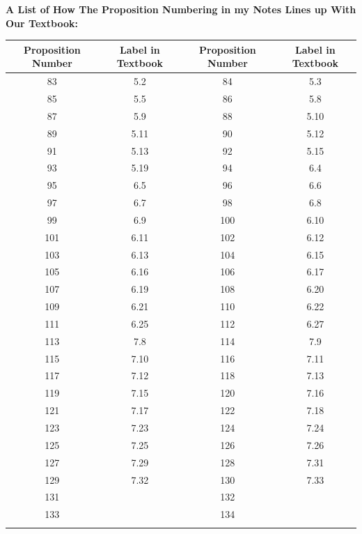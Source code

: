 \documentclass{book}
\newenvironment{allowTableDashes}{\ADLactivate}{\ADLinactivate}
\newcommand{\exOne}{%
   \color{Purple}%
   \fontsize{14}{16}\selectfont%
}
\newcommand{\retTwo}{\hfill\bigbreak}
\newcommand{\myVS}{\vphantom{$\int_a^b$}}
\begin{document}
\newpage
{\huge \color{Black} \textbf{A List of How The Proposition Numbering in my Notes Lines up With Our Textbook:} \retTwo}
\exOne

\begin{allowTableDashes}
   \begin{tabular}{ c|c||c|c }
      Proposition Number & Label in Textbook & Proposition Number & Label in Textbook \\ \hline
      
      \myVS 83 & 5.2 & 84 & 5.3 \\ \hdashline[10pt/3pt]
      \myVS 85 & 5.5 & 86 & 5.8 \\ \hdashline[10pt/3pt]
      \myVS 87 & 5.9  & 88 & 5.10 \\ \hdashline[10pt/3pt]
      \myVS 89 & 5.11 & 90 & 5.12 \\ \hdashline[10pt/3pt]
      \myVS 91 & 5.13 & 92 & 5.15 \\ \hdashline[10pt/3pt]
      \myVS 93 & 5.19 & 94 & 6.4  \\ \hdashline[10pt/3pt]
      \myVS 95 & 6.5 & 96 & 6.6 \\ \hdashline[10pt/3pt]
      \myVS 97 & 6.7 & 98 & 6.8 \\ \hdashline[10pt/3pt]
      \myVS 99 & 6.9 & 100 & 6.10 \\ \hdashline[10pt/3pt]
      \myVS 101 & 6.11 & 102 & 6.12 \\ \hdashline[10pt/3pt]
      \myVS 103 & 6.13 & 104 & 6.15 \\ \hdashline[10pt/3pt]
      \myVS 105 & 6.16 & 106 & 6.17 \\ \hdashline[10pt/3pt]
      \myVS 107 & 6.19 & 108 & 6.20 \\ \hdashline[10pt/3pt]
      \myVS 109 & 6.21 & 110 & 6.22 \\ \hdashline[10pt/3pt]
      \myVS 111 & 6.25 & 112 & 6.27 \\ \hdashline[10pt/3pt]
      \myVS 113 & 7.8 & 114 & 7.9 \\ \hdashline[10pt/3pt]
      \myVS 115 & 7.10 & 116 & 7.11 \\ \hdashline[10pt/3pt]
      \myVS 117 & 7.12 & 118 & 7.13 \\ \hdashline[10pt/3pt]
      \myVS 119 & 7.15 & 120 & 7.16 \\ \hdashline[10pt/3pt]
      \myVS 121 & 7.17 & 122 & 7.18 \\ \hdashline[10pt/3pt]
      \myVS 123 & 7.23 & 124 & 7.24 \\ \hdashline[10pt/3pt]
      \myVS 125 & 7.25 & 126 & 7.26 \\ \hdashline[10pt/3pt]
      \myVS 127 & 7.29 & 128 & 7.31 \\ \hdashline[10pt/3pt]
      \myVS 129 & 7.32 & 130 & 7.33 \\ \hdashline[10pt/3pt]
      \myVS 131 &  & 132 &  \\ \hdashline[10pt/3pt]
      \myVS 133 &  & 134 &  \\ \hdashline[10pt/3pt]
   \end{tabular}

\end{allowTableDashes}
\end{document}
